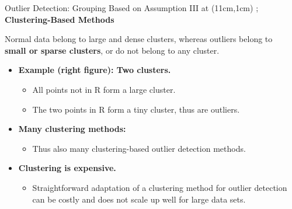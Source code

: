 \begin{frame}{Outlier Detection: Grouping Based on Assumption III}
	\tikzoverlay at (11cm,1cm) {};
	\textcolor{faugray}{\textbf{Clustering-Based Methods}}

	Normal data belong to large and dense clusters, whereas outliers belong to\\ \textbf{\color{airforceblue}small or sparse clusters}, or do not belong to any cluster.
	\begin{itemize}

		\item \textbf{Example (right figure): Two clusters.}
		      \begin{itemize}
			      \item All points not in R form a large cluster.
			      \item The two points in R form a tiny cluster, thus are outliers.

		      \end{itemize}
		\item \textbf{Many clustering methods:}
		      \begin{itemize}
			      \item Thus also many clustering-based outlier detection methods.
		      \end{itemize}
		\item \textbf{Clustering is expensive.}
		      \begin{itemize}
			      \item Straightforward adaptation of a clustering method for outlier detection can be costly and does not scale up well for large data sets.
		      \end{itemize}
	\end{itemize}
\end{frame}
